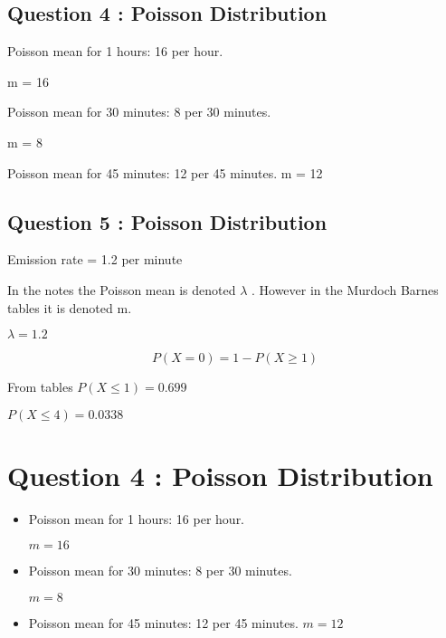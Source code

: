 
\subsection{Question 4 : Poisson Distribution}

Poisson mean for 1 hours: 16 per hour.

m = 16

Poisson mean for 30 minutes: 8 per 30 minutes.

m = 8

Poisson mean for 45 minutes: 12 per 45 minutes. 
m = 12

\subsection{Question 5 : Poisson Distribution}

Emission rate = 1.2 per minute

In the notes the Poisson mean is denoted $\lambda$ . However in the Murdoch Barnes tables it is denoted m.

$\lambda = 1.2$




\[P(X=0) = 1 - P(X\geq 1)\]

From tables $P(X \leq 1) = 0.699$


$P(X \leq 4) = 0.0338 $


\section{Question 4 : Poisson Distribution}

\begin{itemize}
	\item Poisson mean for 1 hours: 16 per hour.
	
	$m = 16$
	
	\item Poisson mean for 30 minutes: 8 per 30 minutes.
	
	$m = 8$
	
	\item Poisson mean for 45 minutes: 12 per 45 minutes. 
	$m = 12$
\end{itemize}





